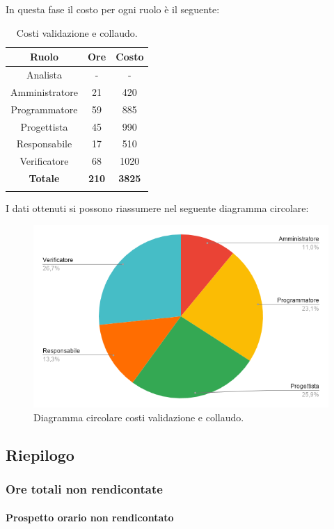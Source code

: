 In questa fase il costo per ogni ruolo è il seguente:
\begin{longtable}{|c|c|c|}
	\hline
	\rowcolor[HTML]{F9CB9C} 
	\textbf{Ruolo} & \textbf{Ore} & \textbf{Costo} \\
	\hline
	Analista &
	- &
	- \\
	\hline
	Amministratore &
	21 &
	420 \\
	\hline
	Programmatore &
	59 &
	885 \\
	\hline
	Progettista &
	45 &
	990 \\
	\hline
	Responsabile  &
	17 &
	510 \\
	\hline
	Verificatore &
	68 &
	1020 \\
	\hline
	\rowcolor[HTML]{F9CB9C} 
	\textbf{Totale} & \textbf{210} & \textbf{3825} \\
	\hline
	\caption{Costi validazione e collaudo.}
	\label{fig: Costi validazione e collaudo.}
\end{longtable}

I dati ottenuti si possono riassumere nel seguente diagramma circolare:
\begin{figure}[H]
	\centering
	\includegraphics[width=0.6\linewidth]{./res/images/CostiValidazioneCollaudo.png}
	\caption{Diagramma circolare costi validazione e collaudo.}
	\label{fig: Diagramma circolare costi validazione e collaudo.}
\end{figure}
			

%
%
%
%
\subsection{Riepilogo}

\subsubsection{Ore totali non rendicontate}

\paragraph{Prospetto orario non rendicontato}

